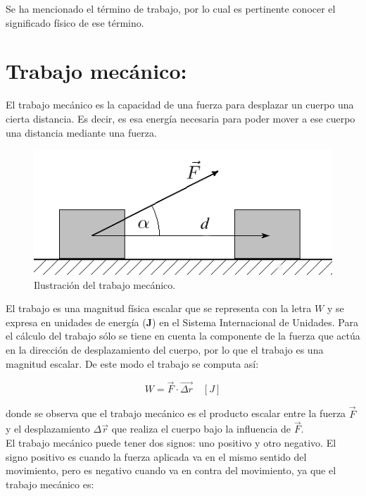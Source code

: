 \documentclass[a5paper,pagesize,10pt,bibtotoc,pointlessnumbers,
normalheadings,DIV=9,fleqn,x11names,table,twoside=false]{scrbook}
\begin{document}
Se ha mencionado el término de trabajo, por lo cual es pertinente conocer el significado físico de ese término.

\section{Trabajo mecánico:}

El trabajo mecánico es la capacidad de una fuerza para desplazar un cuerpo una cierta distancia. Es decir, es esa energía 
necesaria para poder mover a ese cuerpo una distancia mediante una fuerza.\\

\begin{figure}[ht]
 \centering
 \includegraphics[scale=0.5]{images/trabajo.png}
 \caption{Ilustración del trabajo mecánico.}\label{tmec}
\end{figure}

El trabajo es una magnitud física escalar que se representa con la letra $W$ y se expresa en unidades de energía (\textbf{J}) en 
el Sistema Internacional de Unidades. Para el cálculo del trabajo sólo se tiene en cuenta la componente de la fuerza que actúa en 
la dirección de desplazamiento del cuerpo, por lo que el trabajo es una magnitud escalar. De este modo el trabajo se computa así:

\begin{equation}
W = \vec{F}\cdot\vec{\Delta r}\quad [J]
\end{equation}

donde se observa que el trabajo mecánico es el producto escalar entre la fuerza $\vec{F}$ y el desplazamiento $\Delta \vec{r}$ que 
realiza el cuerpo bajo la influencia de $\vec{F}$.\\

El trabajo mecánico puede tener dos signos: uno positivo y otro negativo. El signo positivo es cuando la fuerza aplicada va en el 
mismo sentido del movimiento, pero es negativo cuando va en contra del movimiento, ya que el trabajo mecánico es:
\end{document}
